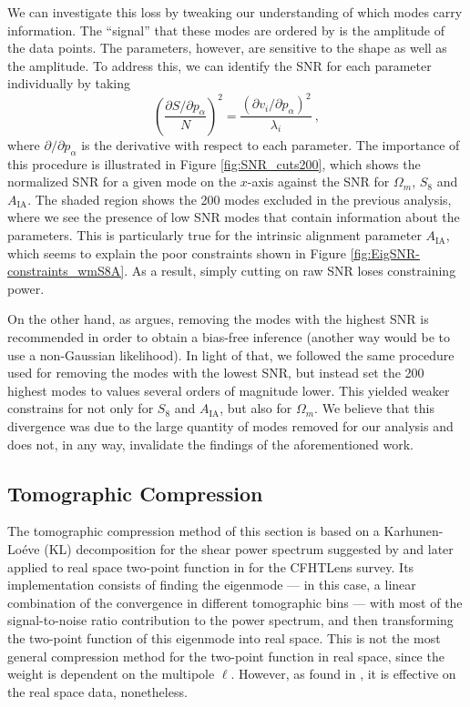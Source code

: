 \documentclass[aps, prd, twocolumn, superscriptaddress, nofootinbib, amssymb, amsmath]{revtex4-2}
\newcommand{\rf}[1]{Figure \ref{fig:#1}}
\newcommand\be{\begin{equation}}
\newcommand\ee{\end{equation}}
\begin{document}
We can investigate this loss by tweaking our understanding of which modes carry information. The ``signal'' that these modes are ordered by is the amplitude of the data points.  The parameters, however, are sensitive to the shape as well as the amplitude. To address this, we can identify the SNR for each parameter individually by taking
\be
\left(\frac{\partial S/\partial p_\alpha}{N}\right)^2 = \frac{(\partial v_i / \partial p_\alpha)^2}{\lambda_i}\
,\ee
where $\partial /\partial p_\alpha$ is the derivative with respect to each parameter. The importance of this procedure is illustrated in \rf{SNR_cuts200}, which shows the normalized SNR for a given mode on the $x$-axis against the SNR for $\Omega_m$, $S_8$ and $A_{\text{IA}}$. The shaded region shows the 200 modes excluded in the previous analysis, where we see the presence of low SNR modes that contain information about the parameters. This is particularly true for the intrinsic alignment parameter $A_{\text{IA}}$, which seems to explain the poor constraints shown in \rf{EigSNR-constraints_wmS8A}. As a result, simply cutting on raw SNR loses constraining power.

On the other hand, as \cite{Louca:2020} argues, removing the modes with the highest SNR is recommended in order to obtain a bias-free inference (another way would be to use a non-Gaussian likelihood). In light of that, we followed the same procedure used for removing the modes with the lowest SNR, but instead set the 200 highest modes to values several orders of magnitude lower. This yielded weaker constrains for not only for $S_8$ and $A_{\text{IA}}$, but also for $\Omega_m$. We believe that this divergence was due to the large quantity of modes removed for our analysis and does not, in any way, invalidate the findings of the aforementioned work.

\subsection{Tomographic Compression}\label{subsec:tomographic_compression}

The tomographic compression method of this section is based on a Karhunen-Lo\'eve (KL) decomposition for the shear power spectrum suggested by \cite{Alonso:2017hhj} and later applied to real space two-point function in \cite{Bellini:2019ssw} for the CFHTLens survey. Its implementation consists of finding the eigenmode --- in this case, a linear combination of the convergence in different tomographic bins --- with most of the signal-to-noise ratio contribution to the power spectrum, and then transforming the two-point function of this eigenmode into real space. This is not the most general compression method for the two-point function in real space, since the weight is dependent on the multipole $\ell$. However, as found in \cite{Bellini:2019ssw}, it is effective on the real space data, nonetheless.
\end{document}

